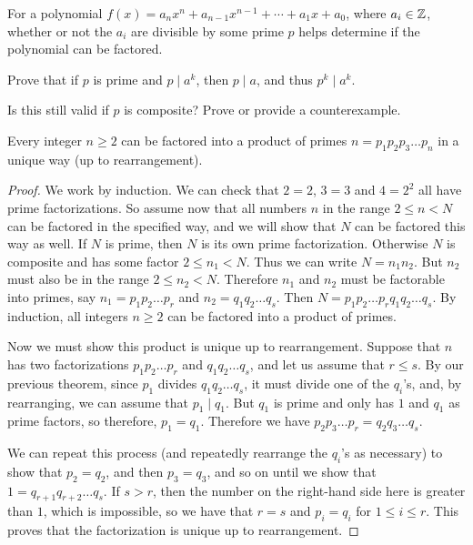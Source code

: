 \documentclass[letterpaper, 11 pt]{article}
\begin{document}
For a polynomial $f(x)=a_n x^n+a_{n-1}x^{n-1}+\cdots+a_1 x+a_0$, where $a_i\in\mathbb Z$, whether or not the $a_i$ are divisible by some prime $p$ helps determine if the polynomial can be factored.
\begin{br}
 Prove that if $p$ is prime and $p\mid a^k$, then $p\mid a$, and thus $p^k\mid a^k$. 
 
 Is this still valid if $p$ is composite? Prove or provide a counterexample.
\end{br}

\begin{thm}  Every integer $n\ge 2$ can be factored into a product of primes $n=p_1 p_2 p_3\dots p_n$ in a unique way (up to rearrangement).\end{thm}
\begin{proof}
We work by induction. We can check that $2=2$, $3=3$ and $4=2^2$ all have prime factorizations. So assume now that all numbers $n$ in the range $2\le n<N$ can be factored in the specified way, and we will show that $N$ can be factored this way as well. If $N$ is prime, then $N$ is its own prime factorization. Otherwise $N$ is composite and has some factor $2\le n_1< N$. Thus we can write $N=n_1n_2$. But $n_2$ must also be in the range $2\le n_2 < N$. Therefore $n_1$ and $n_2$ must be factorable into primes, say $n_1=p_1p_2\dots p_r$ and $n_2= q_1q_2\dots q_s$. Then $N=p_1p_2\dots p _r q_1q_2\dots q_s$. By induction, all integers $n\ge 2$ can be factored into a product of primes.

Now we must show this product is unique up to rearrangement. Suppose that $n$ has two factorizations $p_1p_2\dots p_r$ and $q_1q_2\dots q_s$, and let us assume that $r\le s$. By our previous theorem, since $p_1$ divides $q_1q_2\dots q_s$, it must divide one of the $q_i$'s, and, by rearranging, we can assume that $p_1\mid q_1$. But $q_1$ is prime and only has $1$ and $q_1$ as prime factors, so therefore, $p_1=q_1$. Therefore we have $p_2p_3\dots p_r = q_2q_3\dots q_s$. 

We can repeat this process (and repeatedly rearrange the $q_i$'s as necessary) to show that $p_2=q_2$, and then $p_3=q_3$, and so on until we show that $1=q_{r+1}q_{r+2}\dots q_s$. If $s>r$, then the number on the right-hand side here is greater than $1$, which is impossible, so we have that $r=s$ and $p_i=q_i$ for $1\le i \le r$. This proves that the factorization is unique up to rearrangement.
\end{proof}
\end{document}
